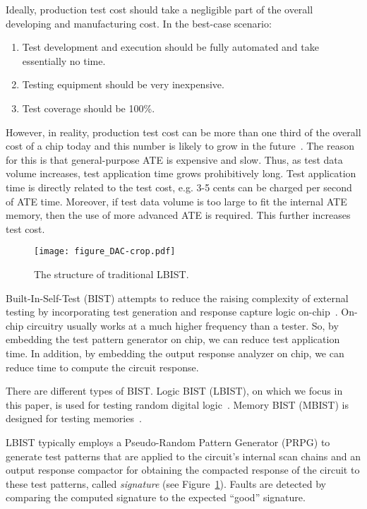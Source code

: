 \documentclass[conference]{IEEEtran}
\begin{document}
Ideally, production test cost should take a negligible part of the overall developing and manufacturing cost. In the best-case scenario:
\begin{enumerate}
\item Test development and execution should be fully automated and take essentially no time.
\item Testing equipment should be very inexpensive.
\item Test coverage should be 100\%.
\end{enumerate}

However, in reality, production test cost can be more than one third of the overall cost of a chip today and this number is likely to grow in the future~\cite{HeF99}. The reason for this is that general-purpose ATE is expensive and slow. Thus, as test data volume increases, test application time grows prohibitively long.
Test application time is directly related to the test cost, e.g. 3-5 cents can be charged per second of ATE time. Moreover, if test data volume is too large to fit the internal ATE memory, then
the use of more advanced ATE is required. This further increases test cost.

\begin{figure}[t]
\begin{center}
\texttt{[image: figure\_DAC-crop.pdf]}
\caption{The structure of traditional LBIST.}\label{lbist}
\end{center}
\end{figure}

Built-In-Self-Test (BIST) attempts to reduce the raising complexity of external testing by 
incorporating test generation and response capture logic on-chip~\cite{McC85}. On-chip circuitry usually works at a much higher frequency than
a tester. So, by embedding the test pattern generator on chip, we can reduce test application time. In
addition, by embedding the output response analyzer on chip, we can reduce time to compute the circuit
response.

There are different types of BIST. Logic BIST (LBIST), on which we focus in this paper, is used for testing random digital logic~\cite{RaT98}. Memory BIST (MBIST) is designed for testing memories~\cite{Sh02}.

LBIST typically employs a Pseudo-Random Pattern Generator (PRPG) to generate test patterns that are applied to the circuit's internal scan chains and an output response compactor for obtaining the compacted response of the circuit to these test patterns, called {\em signature} (see Figure~\ref{lbist}). Faults are detected by comparing the computed signature to the expected ``good'' signature.
 
\end{document}
